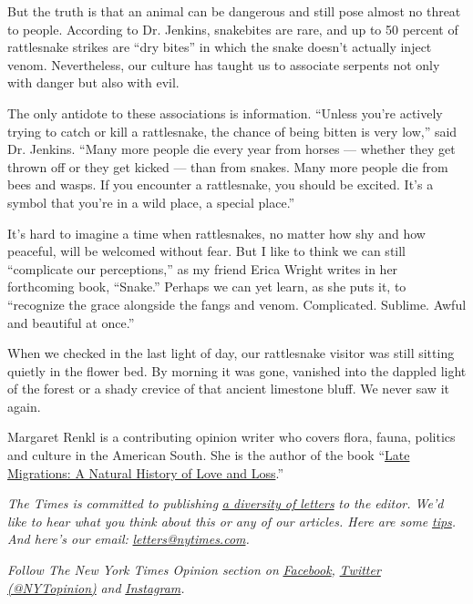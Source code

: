 But the truth is that an animal can be dangerous and still pose almost
no threat to people. According to Dr. Jenkins, snakebites are rare, and
up to 50 percent of rattlesnake strikes are ``dry bites'' in which the
snake doesn't actually inject venom. Nevertheless, our culture has
taught us to associate serpents not only with danger but also with evil.

The only antidote to these associations is information. ``Unless you're
actively trying to catch or kill a rattlesnake, the chance of being
bitten is very low,'' said Dr. Jenkins. ``Many more people die every
year from horses --- whether they get thrown off or they get kicked ---
than from snakes. Many more people die from bees and wasps. If you
encounter a rattlesnake, you should be excited. It's a symbol that
you're in a wild place, a special place.''

It's hard to imagine a time when rattlesnakes, no matter how shy and how
peaceful, will be welcomed without fear. But I like to think we can
still ``complicate our perceptions,'' as my friend Erica Wright writes
in her forthcoming book, ``Snake.'' Perhaps we can yet learn, as she
puts it, to ``recognize the grace alongside the fangs and venom.
Complicated. Sublime. Awful and beautiful at once.''

When we checked in the last light of day, our rattlesnake visitor was
still sitting quietly in the flower bed. By morning it was gone,
vanished into the dappled light of the forest or a shady crevice of that
ancient limestone bluff. We never saw it again.

Margaret Renkl is a contributing opinion writer who covers flora, fauna,
politics and culture in the American South. She is the author of the
book ``\href{https://milkweed.org/book/late-migrations}{Late Migrations:
A Natural History of Love and Loss}.''

\emph{The Times is committed to publishing}
\href{https://www.nytimes.com/2019/01/31/opinion/letters/letters-to-editor-new-york-times-women.html}{\emph{a
diversity of letters}} \emph{to the editor. We'd like to hear what you
think about this or any of our articles. Here are some}
\href{https://help.nytimes.com/hc/en-us/articles/115014925288-How-to-submit-a-letter-to-the-editor}{\emph{tips}}\emph{.
And here's our email:}
\href{mailto:letters@nytimes.com}{\emph{letters@nytimes.com}}\emph{.}

\emph{Follow The New York Times Opinion section on}
\href{https://www.facebook.com/nytopinion}{\emph{Facebook}}\emph{,}
\href{http://twitter.com/NYTOpinion}{\emph{Twitter (@NYTopinion)}}
\emph{and}
\href{https://www.instagram.com/nytopinion/}{\emph{Instagram}}\emph{.}

